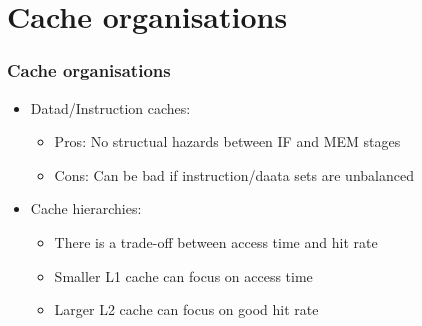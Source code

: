 \documentclass{beamer}
\begin{document}
\section{Cache organisations}
\begin{frame}
\frametitle{Cache organisations}
\begin{itemize}
\item Datad/Instruction caches:
\begin{itemize}
\item Pros: No structual hazards between IF and MEM stages
\item Cons: Can be bad if instruction/daata sets are unbalanced
\end{itemize}
\item Cache hierarchies:
\begin{itemize}
\item There is a trade-off between access time and hit rate
\item Smaller L1 cache can focus on access time
\item Larger L2 cache can focus on good hit rate
\end{itemize}
\end{itemize}
\end{frame}
\end{document}
